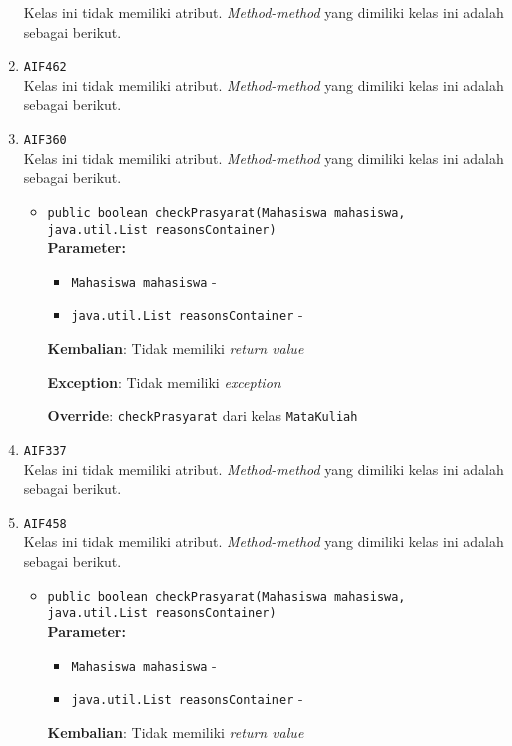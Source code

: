 \documentclass{article}
\begin{document}
\begin{enumerate}
Kelas ini tidak memiliki atribut. \textit{Method-method} yang dimiliki kelas ini adalah sebagai berikut.
\begin{itemize}
\end{itemize}
\item \texttt{AIF462}\\ 
Kelas ini tidak memiliki atribut. \textit{Method-method} yang dimiliki kelas ini adalah sebagai berikut.
\begin{itemize}
\end{itemize}
\item \texttt{AIF360}\\ 
Kelas ini tidak memiliki atribut. \textit{Method-method} yang dimiliki kelas ini adalah sebagai berikut.
\begin{itemize}
\item \texttt{public boolean checkPrasyarat(Mahasiswa mahasiswa, java.util.List reasonsContainer)}\\ 


\textbf{Parameter:}\begin{itemize}
\item \texttt{Mahasiswa mahasiswa} - 
\item \texttt{java.util.List reasonsContainer} - 
\end{itemize}
\textbf{Kembalian}: Tidak memiliki \textit{return value}

\textbf{Exception}: Tidak memiliki \textit{exception}

\textbf{Override}: \texttt{checkPrasyarat} dari kelas \texttt{MataKuliah}

\end{itemize}
\item \texttt{AIF337}\\ 
Kelas ini tidak memiliki atribut. \textit{Method-method} yang dimiliki kelas ini adalah sebagai berikut.
\begin{itemize}
\end{itemize}
\item \texttt{AIF458}\\ 
Kelas ini tidak memiliki atribut. \textit{Method-method} yang dimiliki kelas ini adalah sebagai berikut.
\begin{itemize}
\item \texttt{public boolean checkPrasyarat(Mahasiswa mahasiswa, java.util.List reasonsContainer)}\\ 


\textbf{Parameter:}\begin{itemize}
\item \texttt{Mahasiswa mahasiswa} - 
\item \texttt{java.util.List reasonsContainer} - 
\end{itemize}
\textbf{Kembalian}: Tidak memiliki \textit{return value}


\end{itemize}
\end{enumerate}
\end{document}
